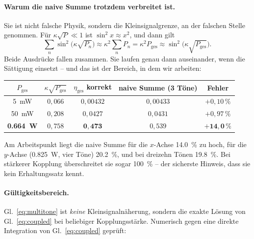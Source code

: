 \documentclass[11pt,a4paper]{article}
\begin{document}
\paragraph{Warum die naive Summe trotzdem verbreitet ist.}
Sie ist nicht falsche Physik, sondern die Kleinsignalgrenze, an der falschen
Stelle genommen. Für $\kappa\sqrt{P}\ll1$ ist $\sin^2 x\approx x^2$, und dann
gilt
\begin{equation}
  \sum_n \sin^2\!\bigl(\kappa\sqrt{P_n}\bigr) \approx \kappa^2\sum_n P_n
  = \kappa^2 P_\mathrm{ges} \approx \sin^2\!\bigl(\kappa\sqrt{P_\mathrm{ges}}\bigr) .
\end{equation}
Beide Ausdrücke fallen zusammen. Sie laufen genau dann auseinander, wenn die
Sättigung einsetzt -- und das ist der Bereich, in dem wir arbeiten:

\begin{center}
\begin{tabular}{ccccc}
  \toprule
  $P_\mathrm{ges}$ & $\kappa\sqrt{P_\mathrm{ges}}$ & $\eta_\mathrm{ges}$ korrekt
    & naive Summe (3 Töne) & Fehler\\
  \midrule
  \SI{5}{\milli\watt}   & $0{,}066$ & $0{,}00432$ & $0{,}00433$ & $+0{,}10\,\%$\\
  \SI{50}{\milli\watt}  & $0{,}208$ & $0{,}0427$  & $0{,}0431$  & $+0{,}97\,\%$\\
  \textbf{\SI{0.664}{\watt}} & $0{,}758$ & $\mathbf{0{,}473}$ & $0{,}539$ & $\mathbf{+14{,}0\,\%}$\\
  \bottomrule
\end{tabular}
\end{center}

\noindent Am Arbeitspunkt liegt die naive Summe für die $x$-Achse
\SI{14.0}{\percent} zu hoch, für die $y$-Achse (\SI{0.825}{\watt}, vier Töne)
\SI{20.2}{\percent}, und bei dreizehn Tönen \SI{19.8}{\percent}. Bei
stärkerer Kopplung überschreitet sie sogar \SI{100}{\percent} -- der
sicherste Hinweis, dass sie kein Erhaltungssatz kennt.

\paragraph{Gültigkeitsbereich.}
Gl.~\eqref{eq:multitone} ist \emph{keine} Kleinsignalnäherung, sondern die
exakte Lösung von Gl.~\eqref{eq:coupled} bei beliebiger Kopplungsstärke.
Numerisch gegen eine direkte Integration von Gl.~\eqref{eq:coupled} geprüft:
\end{document}
